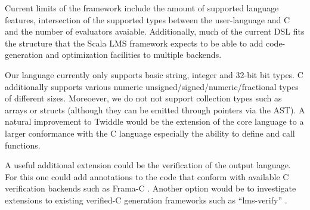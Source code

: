 \documentclass{article}
\begin{document}
Current limits of the framework include the amount of supported language features, intersection of the supported types between the user-language and C and the number of evaluators avaiable. Additionally, much of the current DSL fits the structure
that the Scala LMS framework expects to be able to add code-generation and optimization facilities to multiple backends.

Our language currently only supports basic string, integer and 32-bit bit types. C additionally supports various numeric unsigned/signed/numeric/fractional types of different sizes. Moreoever, we do not not support collection types such as arrays or structs (although they can be emitted through pointers via the AST). A natural improvement to Twiddle would be the extension of the core language
to a larger conformance with the C language especially the ability to define and call functions.

A useful additional extension could be the verification of the output language. For this one could add annotations to the code that conform with available C verification backends such as Frama-C \cite{cuoq2012frama}. Another option would be to investigate extensions to existing verified-C generation frameworks such as ``lms-verify'' \cite{amin2017lms}.



\end{document}
